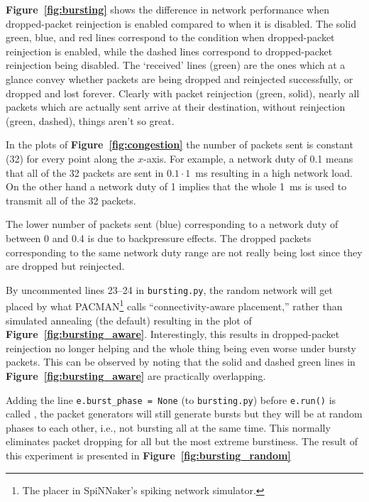 \documentclass[a4paper, 11pt]{article}
\newlength\drop
\begin{document}
\textbf{Figure~\ref{fig:bursting}} shows the difference in network performance when dropped-packet reinjection is enabled compared to when it is disabled. The solid green, blue, and red lines correspond to the condition when dropped-packet reinjection is enabled, while the dashed lines correspond to dropped-packet reinjection being disabled. The `received' lines (green) are the ones which at a glance convey whether packets are being dropped and reinjected successfully, or dropped and lost forever. Clearly with packet reinjection (green, solid), nearly all packets which are actually sent arrive at their destination, without reinjection (green, dashed), things aren't so great. 

In the plots of \textbf{Figure~\ref{fig:congestion}} the number of packets sent is constant (32) for every point along the $x$-axis. For example, a network duty of 0.1 means that all of the 32 packets are sent in $0.1 \cdot 1$~ms resulting in a high network load. On the other hand a network duty of 1 implies that the whole 1~ms is used to transmit all of the 32 packets.

The lower number of packets sent (blue) corresponding to a network duty of between 0 and 0.4 is due to backpressure effects. The dropped packets corresponding to the same network duty range are not really being lost since they are dropped but reinjected.

By uncommented lines 23--24 in \verb|bursting.py|, the random network will get placed by what PACMAN\footnote{The placer in SpiNNaker's spiking network simulator.} calls ``connectivity-aware placement,'' rather than simulated annealing (the default) resulting in the plot of \textbf{Figure~\ref{fig:bursting_aware}}. Interestingly, this results in dropped-packet reinjection no longer helping and the whole thing being even worse under bursty packets. This can be observed by noting that the solid and dashed green lines in \textbf{Figure~\ref{fig:bursting_aware}} are practically overlapping.

Adding the line \verb|e.burst_phase = None| (to \verb|bursting.py|) before \verb|e.run()| is called , the packet generators will still generate bursts but they will be at random phases to each other, i.e., not bursting all at the same time. This normally eliminates packet dropping for all but the most extreme burstiness. The result of this experiment is presented in \textbf{Figure~\ref{fig:bursting_random}}
\end{document}
